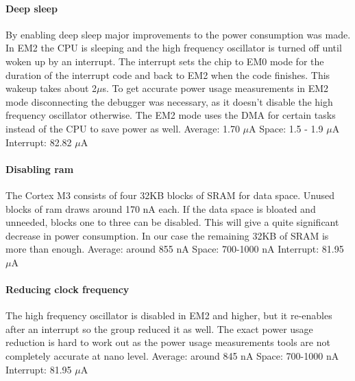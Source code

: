 \paragraph{Deep sleep}
By enabling deep sleep major improvements to the power consumption was made. In EM2 the CPU is sleeping and the high frequency oscillator is turned off until woken up by an interrupt. The interrupt sets the chip to EM0 mode for the duration of the interrupt code and back to EM2 when the code finishes. This wakeup takes about 2$\mu$s. To get accurate power usage measurements in EM2 mode disconnecting the debugger was necessary, as it doesn't disable the high frequency oscillator otherwise. The EM2 mode uses the DMA for certain tasks instead of the CPU to save power as well.\newline\newline
Average: 1.70 $\mu$A \newline
Space: 1.5 - 1.9 $\mu$A \newline
Interrupt: 82.82 $\mu$A 

\paragraph{Disabling ram}
The Cortex M3 consists of four 32KB blocks of SRAM for data space. Unused blocks of ram draws around 170 nA each. If the data space is bloated and unneeded, blocks one to three can be disabled. This will give a quite significant decrease in power consumption. In our case the remaining 32KB of SRAM is more than enough.\newline\newline
Average: around 855 nA\newline
Space: 700-1000 nA\newline
Interrupt: 81.95 $\mu$A

\paragraph{Reducing clock frequency}
The high frequency oscillator is disabled in EM2 and higher, but it re-enables after an interrupt so the group reduced it as well. The exact power usage reduction is hard to work out as the power usage measurements tools are not completely accurate at nano level.\newline\newline
Average: around 845 nA\newline
Space: 700-1000 nA\newline
Interrupt: 81.95 $\mu$A


